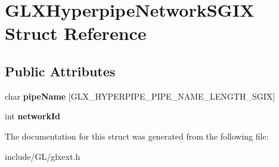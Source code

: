\hypertarget{structGLXHyperpipeNetworkSGIX}{\section{\-G\-L\-X\-Hyperpipe\-Network\-S\-G\-I\-X \-Struct \-Reference}
\label{structGLXHyperpipeNetworkSGIX}
}
\subsection*{\-Public \-Attributes}
\begin{DoxyCompactItemize}
\item 
\hypertarget{structGLXHyperpipeNetworkSGIX_a6338b9717fa895aec16b932f2ef693ed}{char {\bfseries pipe\-Name} \mbox{[}\-G\-L\-X\-\_\-\-H\-Y\-P\-E\-R\-P\-I\-P\-E\-\_\-\-P\-I\-P\-E\-\_\-\-N\-A\-M\-E\-\_\-\-L\-E\-N\-G\-T\-H\-\_\-\-S\-G\-I\-X\mbox{]}}\label{structGLXHyperpipeNetworkSGIX_a6338b9717fa895aec16b932f2ef693ed}

\item 
\hypertarget{structGLXHyperpipeNetworkSGIX_a81393053988b32fadb0b21615024add1}{int {\bfseries network\-Id}}\label{structGLXHyperpipeNetworkSGIX_a81393053988b32fadb0b21615024add1}

\end{DoxyCompactItemize}


\-The documentation for this struct was generated from the following file\-:\begin{DoxyCompactItemize}
\item 
include/\-G\-L/glxext.\-h\end{DoxyCompactItemize}
